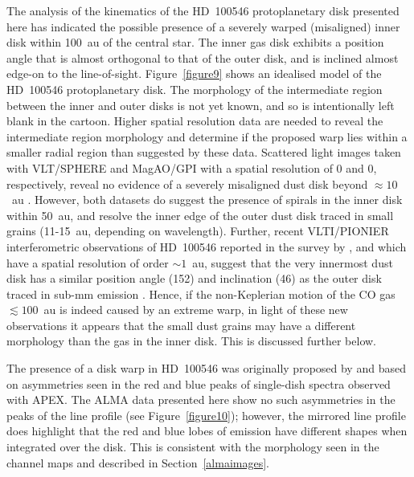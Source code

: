 \documentclass[onecolumn]{aastex6}
\begin{document}
The analysis of the kinematics of the HD~100546 protoplanetary disk  presented
here has indicated the  possible presence of a severely warped (misaligned)
inner disk within 100~au of the central star.   The inner gas disk exhibits a
position angle that is almost orthogonal to that of the outer disk,  and is
inclined almost edge-on to the line-of-sight.   Figure~\ref{figure9} shows an
idealised model of the HD~100546  protoplanetary disk.   The morphology of the
intermediate region between the inner and outer disks is not yet known, and so
is intentionally left blank in the cartoon.   Higher spatial resolution data are
needed to reveal the intermediate region morphology and  determine if the
proposed warp lies within a smaller radial region than suggested by these data.
Scattered light images taken with VLT/SPHERE and MagAO/GPI with a spatial
resolution  of 0 and 0, respectively, reveal no evidence of a
severely misaligned  dust disk beyond $\approx10$~au
\citep{garufi16,follette17}. However, both datasets do suggest the presence of
spirals in the inner disk within 50~au, and resolve the inner  edge of the outer
dust disk traced in small grains (11-15~au, depending on wavelength). Further,
recent VLTI/PIONIER interferometric observations of HD~100546 reported in the
survey by \citet{lazareff17}, and which have a spatial resolution of order $\sim
1$~au,  suggest that the very innermost dust disk has a similar position  angle
(152\degree) and inclination (46\degree) as the outer disk traced in  sub-mm
emission \citep[146\degree\ and 44\degree, respectively;][]{walsh14}.   Hence,
if the non-Keplerian motion of  the CO gas $\lesssim 100$~au is indeed caused by
an extreme warp, in light  of these new observations it appears that the small
dust grains may have a different morphology than the gas in the inner disk. This is
discussed further below.

The presence of a disk warp in HD~100546 was originally  proposed by
\citet{panic10} and based on asymmetries seen  in the red and blue peaks of
single-dish spectra  observed with APEX.   The ALMA data presented here show no
such asymmetries in the  peaks of the line profile (see Figure~\ref{figure10});
however,  the mirrored line profile does highlight that the red and blue  lobes
of emission have different shapes when integrated over the disk.   This is
consistent with the morphology seen in the channel maps  and described in
Section~\ref{almaimages}.    
\end{document}
